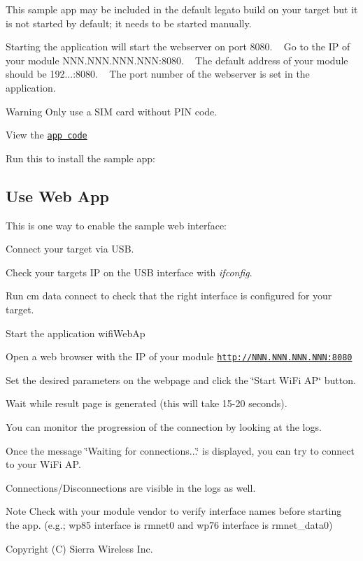 This sample app may be included in the default legato build on your target but it is not started by default; it needs to be started manually.

Starting the application will start the webserver on port 8080. ~\newline
 Go to the IP of your module N\+N\+N.\+N\+N\+N.\+N\+N\+N.\+N\+NN\+:8080. ~\newline
 The default address of your module should be 192...\+:8080. ~\newline
 The port number of the webserver is set in the application. ~\newline


\begin{DoxyWarning}{Warning}
Only use a S\+IM card without P\+IN code.
\end{DoxyWarning}
View the \href{https://github.com/legatoproject/legato-WiFi/tree/master/apps/sample/wifiWebAp}{\tt app code}

Run this to install the sample app\+: 
\hypertarget{wifi_wifiwebAp_sample_wifi_wifiwebAp_sample_StepByStep}{}\subsection{Use Web App}\label{wifi_wifiwebAp_sample_wifi_wifiwebAp_sample_StepByStep}
This is one way to enable the sample web interface\+:


\begin{DoxyEnumerate}
\item Connect your target via U\+SB.
\item Check your targets IP on the U\+SB interface with {\itshape ifconfig}.
\item Run {\ttfamily cm data connect} to check that the right interface is configured for your target.
\item Start the application wifi\+Web\+Ap
\item Open a web browser with the IP of your module \href{http://NNN.NNN.NNN.NNN:8080}{\tt http\+://\+N\+N\+N.\+N\+N\+N.\+N\+N\+N.\+N\+N\+N\+:8080}
\item Set the desired parameters on the webpage and click the \char`\"{}\+Start Wi\+Fi A\+P\char`\"{} button.
\item Wait while result page is generated (this will take 15-\/20 seconds).
\item You can monitor the progression of the connection by looking at the logs.
\item Once the message \char`\"{}\+Waiting for connections...\char`\"{} is displayed, you can try to connect to your Wi\+Fi AP.
\item Connections/\+Disconnections are visible in the logs as well.
\end{DoxyEnumerate}

\begin{DoxyNote}{Note}
Check with your module vendor to verify interface names before starting the app. (e.\+g.; wp85 interface is rmnet0 and wp76 interface is rmnet\+\_\+data0)
\end{DoxyNote}
Copyright (C) Sierra Wireless Inc. 